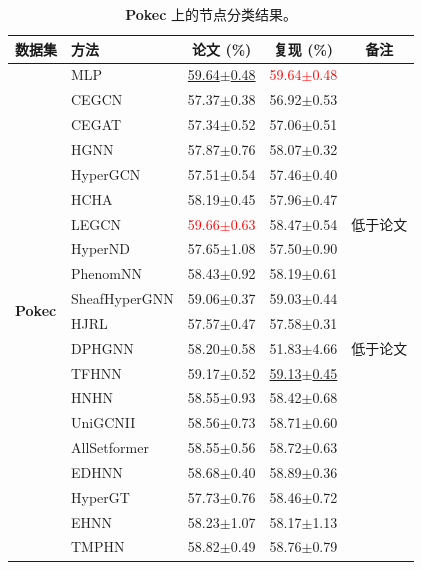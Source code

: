 \documentclass[11pt,a4paper]{article}
\begin{document}
\begin{table}[H]
	\centering\small
	\begin{tabular}{llccc}
		\toprule
		数据集 & 方法 & 论文 (\%) & 复现 (\%) & 备注 \\
		\midrule
		\multirow{20}{*}{\textbf{Pokec}} & MLP               & \underline{59.64$\pm$0.48}   & \textcolor{red}{59.64$\pm$0.48}   &  \\
		 & CEGCN             & 57.37$\pm$0.38   & 56.92$\pm$0.53   &  \\
		 & CEGAT             & 57.34$\pm$0.52   & 57.06$\pm$0.51   &  \\
		 & HGNN              & 57.87$\pm$0.76   & 58.07$\pm$0.32   &  \\
		 & HyperGCN          & 57.51$\pm$0.54   & 57.46$\pm$0.40   &  \\
		 & HCHA              & 58.19$\pm$0.45   & 57.96$\pm$0.47   &  \\
		 & LEGCN             & \textcolor{red}{59.66$\pm$0.63}   & 58.47$\pm$0.54   & 低于论文 \\
		 & HyperND           & 57.65$\pm$1.08   & 57.50$\pm$0.90   &  \\
		 & PhenomNN          & 58.43$\pm$0.92   & 58.19$\pm$0.61   &  \\
		 & SheafHyperGNN     & 59.06$\pm$0.37   & 59.03$\pm$0.44   &  \\
		 & HJRL              & 57.57$\pm$0.47   & 57.58$\pm$0.31   &  \\
		 & DPHGNN            & 58.20$\pm$0.58   & 51.83$\pm$4.66   & 低于论文 \\
		 & TFHNN             & 59.17$\pm$0.52   & \underline{59.13$\pm$0.45}   &  \\
		 & HNHN              & 58.55$\pm$0.93   & 58.42$\pm$0.68   &  \\
		 & UniGCNII          & 58.56$\pm$0.73   & 58.71$\pm$0.60   &  \\
		 & AllSetformer      & 58.55$\pm$0.56   & 58.72$\pm$0.63   &  \\
		 & EDHNN             & 58.68$\pm$0.40   & 58.89$\pm$0.36   &  \\
		 & HyperGT           & 57.73$\pm$0.76   & 58.46$\pm$0.72   &  \\
		 & EHNN              & 58.23$\pm$1.07   & 58.17$\pm$1.13   &  \\
		 & TMPHN             & 58.82$\pm$0.49   & 58.76$\pm$0.79   &  \\
		\bottomrule
	\end{tabular}
	\caption{\textbf{Pokec} 上的节点分类结果。}
\end{table}
\end{document}
